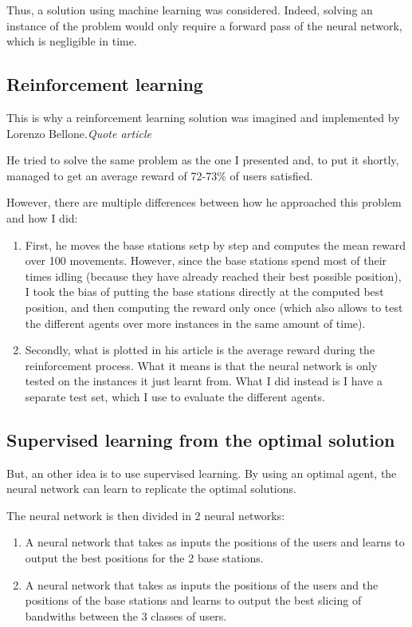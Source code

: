 \documentclass[letterpaper]{article}
\begin{document}
\begin{multicols}{2}
Thus, a solution using machine learning was considered.
Indeed, solving an instance of the problem would only require a forward pass of the neural network, which is negligible in time.

\subsection{Reinforcement learning}

This is why a reinforcement learning solution was imagined and implemented by Lorenzo Bellone.\textit{Quote article}

He tried to solve the same problem as the one I presented and, to put it shortly, managed to get an average reward of 72-73\% of users satisfied.

However, there are multiple differences between how he approached this problem and how I did:

\begin{enumerate}
    \item First, he moves the base stations setp by step and computes the mean reward over 100 movements.
          However, since the base stations spend most of their times idling (because they have already reached their best possible position),
          I took the bias of putting the base stations directly at the computed best position, and then computing the reward only once (which also allows to test the different agents over more instances in the same amount of time).
    \item Secondly, what is plotted in his article is the average reward during the reinforcement process.
          What it means is that the neural network is only tested on the instances it just learnt from.
          What I did instead is I have a separate test set, which I use to evaluate the different agents.
\end{enumerate}

\subsection{Supervised learning from the optimal solution}

But, an other idea is to use supervised learning.
By using an optimal agent, the neural network can learn to replicate the optimal solutions.

The neural network is then divided in 2 neural networks:

\begin{enumerate}
    \item A neural network that takes as inputs the positions of the users and learns to output the best positions for the 2 base stations.
    \item A neural network that takes as inputs the positions of the users and the positions of the base stations and learns to output the best slicing of bandwiths between the 3 classes of users.
\end{enumerate}


\end{multicols}
\end{document}
